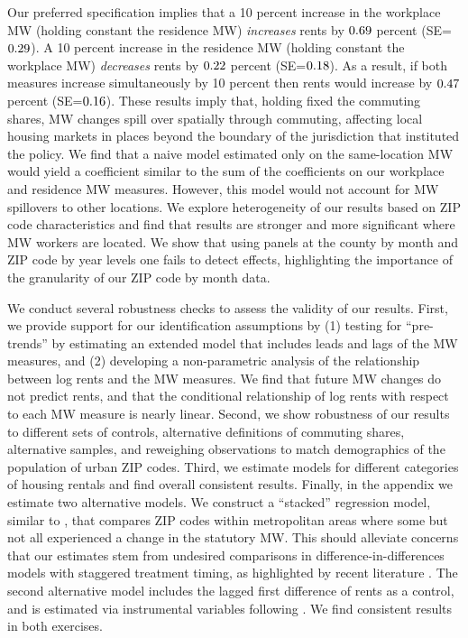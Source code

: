 
Our preferred specification implies that 
a 10 percent increase in the workplace MW (holding constant the residence MW) 
\textit{increases} rents by $\textnormal{0.69}$ percent 
(SE=$\textnormal{0.29}$).
A 10 percent increase in the residence MW (holding constant the workplace MW) 
\textit{decreases} rents by $\textnormal{0.22}$ percent 
(SE=$\textnormal{0.18}$). 
As a result, if both measures increase simultaneously by 10 percent then 
rents would increase by $\textnormal{0.47}$ percent 
(SE=$\textnormal{0.16}$).
These results imply that, holding fixed the commuting shares, MW 
changes spill over spatially through commuting, affecting local housing markets 
in places beyond the boundary of the jurisdiction that instituted the policy.
We find that a naive model estimated only on the same-location MW would yield a 
coefficient similar to the sum of the coefficients on our workplace and 
residence MW measures.
However, this model would not account for MW spillovers to other locations.
We explore heterogeneity of our results based on ZIP code characteristics and
find that results are stronger and more significant where MW workers are 
located.
We show that using panels at the county by month and ZIP code by year levels 
one fails to detect effects, highlighting the importance of the granularity of 
our ZIP code by month data.


We conduct several robustness checks to assess the validity of our results.
First, we provide support for our identification assumptions by
(1) testing for ``pre-trends'' by estimating an extended model that includes 
leads and lags of the MW measures, and 
(2) developing a non-parametric analysis of the relationship between log rents
and the MW measures.
We find that future MW changes do not predict rents, and that the conditional
relationship of log rents with respect to each MW measure is nearly linear.
Second, we show robustness of our results to different sets of controls,
alternative definitions of commuting shares, alternative samples,
and reweighing observations to match demographics of the population of
urban ZIP codes.
Third, we estimate models for different categories of housing rentals and
find overall consistent results.
Finally, in the appendix we estimate two alternative models.
We construct a ``stacked'' regression model, similar to \textcite{CegnizEtAl2019},
that compares ZIP codes within metropolitan areas where some but not all 
experienced a change in the statutory MW.
This should alleviate concerns that our estimates stem from undesired 
comparisons in difference-in-differences models with staggered treatment timing, 
as highlighted by recent literature 
\parencite{deChaisemartinEtAl2022,RothEtAl2022}.
The second alternative model includes the lagged first difference of rents as 
a control, and is estimated via instrumental variables following 
\textcite{ArellanoBond1991}.
We find consistent results in both exercises.


